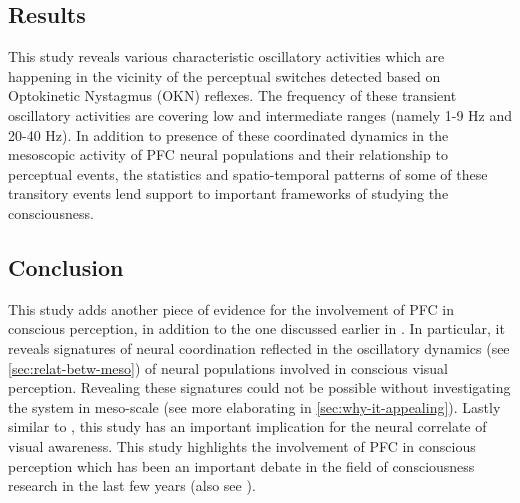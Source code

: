 \subsection*{Results}
This study reveals various characteristic oscillatory activities which are happening in the vicinity of the perceptual switches detected based on Optokinetic Nystagmus (OKN) reflexes.
The frequency of these transient oscillatory activities are covering low and intermediate ranges (namely 1-9 Hz and 20-40 Hz).
In addition to presence of these coordinated dynamics in the mesoscopic activity of PFC neural populations and their relationship to perceptual events,
the statistics and spatio-temporal patterns of some of these transitory events lend support to important frameworks of studying the consciousness.

\subsection*{Conclusion}
This study adds another piece of evidence for the involvement of PFC in conscious perception, in addition to the one discussed earlier in .
In particular, it reveals signatures of neural coordination reflected in the oscillatory dynamics (see \autoref{sec:relat-betw-meso}) of neural populations involved in conscious visual perception.
Revealing these signatures could not be possible without investigating the system in meso-scale 
(see more elaborating in \autoref{sec:why-it-appealing}).
Lastly similar to , this study has an important implication for the neural correlate of visual awareness.
This study highlights the involvement of PFC in conscious perception
which has been an important debate in the field of consciousness research in the last few years (also see ).




